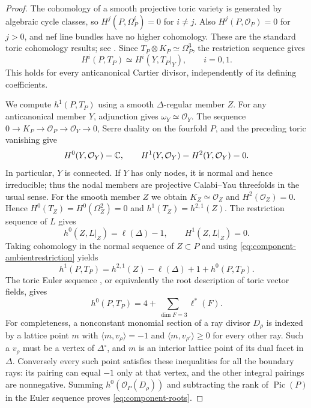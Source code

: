 \begin{proof}
The cohomology of a smooth projective toric variety is generated by
algebraic cycle classes, so $H^j(P,\Omega_P^i)=0$ for $i\ne j$.
Also $H^j(P,\mathcal O_P)=0$ for $j>0$, and nef line bundles have no
higher cohomology. These are the standard toric cohomology results;
see \cite[Thms.~9.2.3, 9.4.11]{CLS}. Since
$T_P\otimes K_P\simeq\Omega_P^3$, the restriction sequence gives
\begin{equation}\label{eq:component-ambientrestriction}
 H^i(P,T_P)\simeq H^i(Y,T_P|_Y),\qquad i=0,1.
\end{equation}
This holds for every anticanonical Cartier divisor, independently of its
defining coefficients.

We compute $h^1(P,T_P)$ using a smooth $\Delta$-regular member $Z$.
For any anticanonical member $Y$, adjunction gives
$\omega_Y\simeq\mathcal O_Y$. The sequence
$0\to K_P\to\mathcal O_P\to\mathcal O_Y\to0$, Serre duality on
the fourfold $P$, and the preceding toric vanishing give
\[
 H^0(Y,\mathcal O_Y)=\mathbb C,\qquad
 H^1(Y,\mathcal O_Y)=H^2(Y,\mathcal O_Y)=0.
\]
In particular, $Y$ is connected. If $Y$ has only nodes, it is normal
and hence irreducible; thus the nodal members are projective
Calabi--Yau threefolds in the usual sense. For the smooth member $Z$
we obtain $K_Z\simeq\mathcal O_Z$ and $H^2(\mathcal O_Z)=0$.
Hence $H^0(T_Z)=H^0(\Omega_Z^2)=0$ and $h^1(T_Z)=h^{2,1}(Z)$.
The restriction sequence of $L$ gives
\[
 h^0(Z,L|_Z)=\ell(\Delta)-1,\qquad H^1(Z,L|_Z)=0.
\]
Taking cohomology in the normal sequence of $Z\subset P$ and using
\eqref{eq:component-ambientrestriction} yields
\begin{equation}\label{eq:component-h1ambient}
 h^1(P,T_P)=h^{2,1}(Z)-\ell(\Delta)+1+h^0(P,T_P).
\end{equation}
The toric Euler sequence \cite[Thm.~8.1.6]{CLS}, or equivalently the root
description of toric vector fields, gives
\begin{equation}\label{eq:component-roots}
 h^0(P,T_P)=4+\sum_{\dim F=3}\ell^*(F).
\end{equation}
For completeness, a nonconstant monomial section of a ray divisor
$D_\rho$ is indexed by a lattice point $m$ with
$\langle m,v_\rho\rangle=-1$ and
$\langle m,v_{\rho'}\rangle\ge0$ for every other ray.
Such a $v_\rho$ must be a vertex of $\Delta^\circ$, and $m$ is an
interior lattice point of its dual facet in $\Delta$. Conversely every
such point satisfies these inequalities for all the boundary rays:
its pairing can equal $-1$ only at that vertex, and the other integral
pairings are nonnegative. Summing $h^0(\mathcal O_P(D_\rho))$ and
subtracting the rank of $\operatorname{Pic}(P)$ in the Euler sequence
proves \eqref{eq:component-roots}.


\end{proof}
